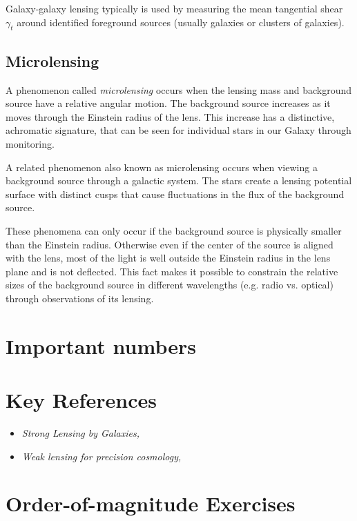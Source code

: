 Galaxy-galaxy lensing typically is used by measuring the mean
tangential shear $\gamma_t$ around identified foreground sources
(usually galaxies or clusters of galaxies). 

\subsection{Microlensing}

A phenomenon called {\it microlensing} occurs when the lensing mass
and background source have a relative angular motion. The background
source increases as it moves through the Einstein radius of the
lens. This increase has a distinctive, achromatic signature, that can
be seen for individual stars in our Galaxy through monitoring.

A related phenomenon also known as microlensing occurs when viewing a
background source through a galactic system. The stars create a
lensing potential surface with distinct cusps that cause fluctuations
in the flux of the background source.

These phenomena can only occur if the background source is physically
smaller than the Einstein radius. Otherwise even if the center of the
source is aligned with the lens, most of the light is well outside the
Einstein radius in the lens plane and is not deflected. This fact
makes it possible to constrain the relative sizes of the background
source in different wavelengths (e.g. radio vs. optical) through
observations of its lensing.

\section{Important numbers}

\section{Key References}

\begin{itemize}
  \item
    {\it Strong Lensing by Galaxies, \href{https://ui.adsabs.harvard.edu/abs/2010ARA%26A..48...87T/abstract}
    {\citet{treu10a}}}
  \item
    {\it Weak lensing for precision cosmology, \href{https://ui.adsabs.harvard.edu/abs/2018ARA%26A..56..393M/abstract}
    {\citet{mandelbaum18a}}}
\end{itemize}

\section{Order-of-magnitude Exercises}

